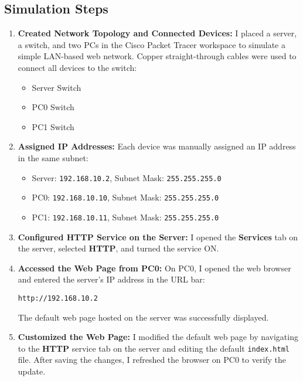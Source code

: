 \documentclass[11pt,a4paper]{article}
\let\oldincludegraphics\includegraphics
\renewcommand{\includegraphics}[2][]{%
  \begin{center}
    \oldincludegraphics[#1]{#2}
  \end{center}
}
\begin{document}
\subsection{Simulation Steps}
\begin{enumerate}

\item \textbf{Created Network Topology and Connected Devices:}  
I placed a server, a switch, and two PCs in the Cisco Packet Tracer workspace to simulate a simple LAN-based web network. Copper straight-through cables were used to connect all devices to the switch:
\begin{itemize}
  \item Server \textrightarrow{} Switch
  \item PC0 \textrightarrow{} Switch
  \item PC1 \textrightarrow{} Switch
\end{itemize}


\item \textbf{Assigned IP Addresses:}  
Each device was manually assigned an IP address in the same subnet:
\begin{itemize}
  \item Server: \texttt{192.168.10.2}, Subnet Mask: \texttt{255.255.255.0}
  \item PC0: \texttt{192.168.10.10}, Subnet Mask: \texttt{255.255.255.0}
  \item PC1: \texttt{192.168.10.11}, Subnet Mask: \texttt{255.255.255.0}
\end{itemize}


\item \textbf{Configured HTTP Service on the Server:}  
I opened the \textbf{Services} tab on the server, selected \textbf{HTTP}, and turned the service ON.


\item \textbf{Accessed the Web Page from PC0:}  
On PC0, I opened the web browser and entered the server’s IP address in the URL bar:
\begin{verbatim}
http://192.168.10.2
\end{verbatim}
The default web page hosted on the server was successfully displayed.


\item \textbf{Customized the Web Page:}  
I modified the default web page by navigating to the \textbf{HTTP} service tab on the server and editing the default \texttt{index.html} file. After saving the changes, I refreshed the browser on PC0 to verify the update.

 \\[1em]

\end{enumerate}
\end{document}
